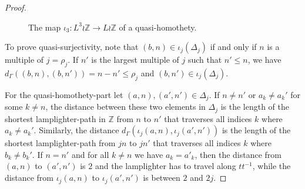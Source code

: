 \documentclass{amsart}
\theoremstyle{definition}
\theoremstyle{remark}
\theoremstyle{remark}
\theoremstyle{definition}
\newcommand{\Z}{\mathbb{Z}} %
\renewcommand{\leq}{\leqslant}
\begin{document}
\begin{proof}
\begin{figure}

	\caption{The map \(\iota_3 \colon L^3 \wr \Z \to L \wr \Z\) of a quasi-homothety.}
	\label{fig-lamplighter-homothety}
\end{figure}

	To prove quasi-surjectivity, note that \((b, n) \in \iota_j(\Delta_j)\) if and only if \(n\) is a multiple of \(j = \rho_j\). If \(n'\) is the largest multiple of \(j\) such that \(n' \leq n\), we have \(d_\Gamma \left( (b, n), (b, n') \right) = n - n' \leq \rho_j\) and \((b, n') \in \iota_j(\Delta_j)\).

	For the quasi-homothety-part let \((a, n), (a', n') \in \Delta_j\).
    If $n\neq n'$ or $a_k \neq a_k'$ for some $k\neq n$, the distance between these two elements in \(\Delta_j\) is the length of the shortest lamplighter-path in \(\Z\) from \(n\) to \(n'\) that traverses all indices $k$ where \(a_k \neq a_k'\).
	Similarly, the distance \(d_\Gamma\left(\iota_j(a, n), \iota_j(a', n')\right)\) is the length of the shortest lamplighter-path from \(jn\) to \(jn'\) that traverses all indices $k$ where \(b_k \neq b_k'\). If $n=n'$ and for all $k\neq n$ we have $a_{k} = a'_k$, then the distance from $(a,n)$ to $(a',n')$ is $2$ and the lamplighter has to travel along $tt^{-1}$, while the distance from $\iota_j(a,n)$ to $\iota_j(a',n')$ is between $2$ and $2j$.


\end{proof}
\end{document}

